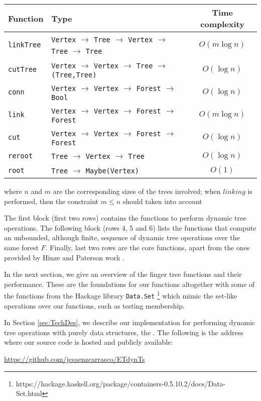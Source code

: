 \begin{center}
\small
 \begin{tabular}{||l | l | c||} 
 \hline
 Function & Type & Time complexity \\ %
 \hline\hline
 \texttt{linkTree} & \texttt{Vertex} $\to$ \texttt{Tree} $\to$ \texttt{Vertex} $\to$ \texttt{Tree} $\to$ \texttt{Tree} & $O(m\log n)$ \\
 \texttt{cutTree} & \texttt{Vertex} $\to$ \texttt{Vertex} $\to$ \texttt{Tree} $\to$ \texttt{(Tree,Tree)} & $O(\log n)$ \\
 \hline
 \texttt{conn} & \texttt{Vertex} $\to$ \texttt{Vertex} $\to$ \texttt{Forest} $\to$ \texttt{Bool} & $O(\log n)$ \\ 
 \texttt{link} & \texttt{Vertex} $\to$ \texttt{Vertex} $\to$ \texttt{Forest} $\to$ \texttt{Forest} & $O(m\log n)$ \\
 \texttt{cut} & \texttt{Vertex} $\to$ \texttt{Vertex} $\to$ \texttt{Forest} $\to$ \texttt{Forest} & $O(\log n)$ \\
 \hline
 \texttt{reroot} & \texttt{Tree} $\to$ \texttt{Vertex} $\to$ \texttt{Tree} & $O(\log n)$ \\
 \texttt{root} & \texttt{Tree} $\to$ \texttt{Maybe(Vertex)} & $O(1)$ \\
 \hline   
\end{tabular}
where $n$ and $m$ are the corresponding sizes of the trees involved; when $linking$ is performed, then the constraint $m \leq n$ should taken into account
\end{center}
\normalsize 

The first block (first two rows) contains the functions to perform dynamic tree operations. The following block (rows 4, 5 and 6) lists the functions that compute an unbounded, although finite, sequence of dynamic tree operations over the same forest $F$. Finally, last two rows are the core functions, apart from the ones provided by Hinze and Paterson work \cite{FTs}. 

In the next section, we give an overview of the finger tree functions and their performance. These are the foundations for our functions altogether with some of the functions from the Hackage library \texttt{Data.Set} \footnote{https://hackage.haskell.org/package/containers-0.5.10.2/docs/Data-Set.html} which mimic the set-like operations over our functions, such as testing membership. 

In Section \ref{sec:TechDes}, we describe our implementation for performing dynamic tree operations with purely data structures, the \dyntset. The following is the address where our source code is hosted and publicly available:
\begin{center}
\url{https://github.com/jcsaenzcarrasco/ETdynTs}
\end{center}

